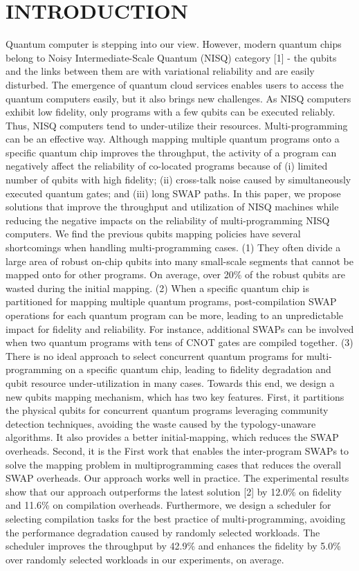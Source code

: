 \documentclass{article}
\begin{document}
	\section{INTRODUCTION}
		Quantum computer is stepping into our view. However, modern
		quantum chips belong to Noisy Intermediate-Scale Quantum (NISQ)
		category [1] - the qubits and the links between them are with
		variational reliability and are easily disturbed. The emergence of
		quantum cloud services enables users to access the quantum computers easily, but it also brings new challenges. As NISQ computers
		exhibit low fidelity, only programs with a few qubits can be executed reliably. Thus, NISQ computers tend to under-utilize their
		resources. Multi-programming can be an effective way. Although
		mapping multiple quantum programs onto a specific quantum chip
		improves the throughput, the activity of a program can negatively
		affect the reliability of co-located programs because of (i) limited
		number of qubits with high fidelity; (ii) cross-talk noise caused by
		simultaneously executed quantum gates; and (iii) long SWAP paths.
		In this paper, we propose solutions that improve the throughput
		and utilization of NISQ machines while reducing the negative impacts on the reliability of multi-programming NISQ computers. We
		find the previous qubits mapping policies have several shortcomings when handling multi-programming cases. (1) They often divide
		a large area of robust on-chip qubits into many small-scale segments that cannot be mapped onto for other programs. On average,
		over 20\% of the robust qubits are wasted during the initial mapping.
		(2) When a specific quantum chip is partitioned for mapping multiple quantum programs, post-compilation SWAP operations for
		each quantum program can be more, leading to an unpredictable
		impact for fidelity and reliability. For instance, additional SWAPs
		can be involved when two quantum programs with tens of CNOT
		gates are compiled together. (3) There is no ideal approach to select
		concurrent quantum programs for multi-programming on a specific
		quantum chip, leading to fidelity degradation and qubit resource
		under-utilization in many cases.
		Towards this end, we design a new qubits mapping mechanism,
		which has two key features. First, it partitions the physical qubits
		for concurrent quantum programs leveraging community detection
		techniques, avoiding the waste caused by the typology-unaware
		algorithms. It also provides a better initial-mapping, which reduces
		the SWAP overheads. Second, it is the First work that enables
		the inter-program SWAPs to solve the mapping problem in multiprogramming cases that reduces the overall SWAP overheads. Our
		approach works well in practice. The experimental results show
		that our approach outperforms the latest solution [2] by 12.0\%
		on fidelity and 11.6\% on compilation overheads. Furthermore, we
		design a scheduler for selecting compilation tasks for the best practice of multi-programming, avoiding the performance degradation
		caused by randomly selected workloads. The scheduler improves
		the throughput by 42.9\% and enhances the fidelity by 5.0\% over
		randomly selected workloads in our experiments, on average.
		
\end{document}
